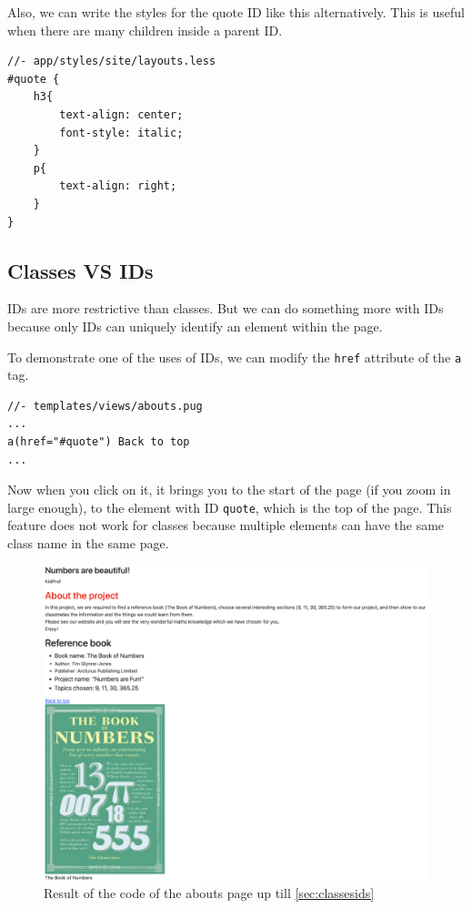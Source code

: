 Also, we can write the styles for the quote ID like this alternatively. This is useful when there are many children inside a parent ID.
\vspace{6mm}

\begin{lstlisting}[language=pug]
//- app/styles/site/layouts.less
#quote {
    h3{
        text-align: center;
        font-style: italic;
    }
    p{
        text-align: right;
    }
}
\end{lstlisting}
\vspace{6mm}

\subsection*{Classes VS IDs}
\label{sec:vsclassesids}

IDs are more restrictive than classes. But we can do something more with IDs because only IDs can uniquely identify an element within the page.

To demonstrate one of the uses of IDs, we can modify the \texttt{href} attribute of the \texttt{a} tag. 

\begin{lstlisting}[language=pug]
//- templates/views/abouts.pug
...
a(href="#quote") Back to top
...
\end{lstlisting}

Now when you click on it, it brings you to the start of the page (if you zoom in large enough), to the element with ID \texttt{quote}, which is the top of the page. This feature does not work for classes because multiple elements can have the same class name in the same page.

\begin{figure}[h]
\centering
\includegraphics[width=15cm]{images/chn2-abouts-styled.png}
\caption{Result of the code of the abouts page up till \cref{sec:classesids}}
\label{fig:aboutspage}
\end{figure}

